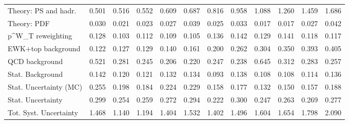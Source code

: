 \begin{tabular}{l|p{0.6cm}p{0.6cm}p{0.6cm}p{0.6cm}p{0.6cm}p{0.6cm}p{0.6cm}p{0.6cm}p{0.6cm}p{0.6cm}p{0.6cm}}
Theory: PS and hadr.                     & 0.501 & 0.516 & 0.552 & 0.609 & 0.687 & 0.816 & 0.958 & 1.088 & 1.260 & 1.459 & 1.686 \\
Theory: PDF                              & 0.030 & 0.021 & 0.023 & 0.027 & 0.039 & 0.025 & 0.033 & 0.017 & 0.017 & 0.027 & 0.042 \\
p^{W}_{T} reweighting                    & 0.128 & 0.103 & 0.112 & 0.109 & 0.105 & 0.136 & 0.142 & 0.129 & 0.141 & 0.118 & 0.117 \\
EWK+top background                       & 0.122 & 0.127 & 0.129 & 0.140 & 0.161 & 0.200 & 0.262 & 0.304 & 0.350 & 0.393 & 0.405 \\
QCD background                           & 0.521 & 0.281 & 0.245 & 0.206 & 0.220 & 0.247 & 0.238 & 0.645 & 0.312 & 0.283 & 0.257 \\
Stat. Background                         & 0.142 & 0.120 & 0.121 & 0.132 & 0.134 & 0.093 & 0.138 & 0.108 & 0.108 & 0.114 & 0.136 \\
Stat. Uncertainty (MC)                   & 0.255 & 0.198 & 0.184 & 0.224 & 0.229 & 0.158 & 0.177 & 0.132 & 0.150 & 0.157 & 0.188 \\
\hline
Stat. Uncertainty                        & 0.299 & 0.254 & 0.259 & 0.272 & 0.294 & 0.222 & 0.300 & 0.247 & 0.263 & 0.269 & 0.277 \\
\hline
Tot. Syst. Uncertainty                   & 1.468 & 1.140 & 1.194 & 1.404 & 1.532 & 1.402 & 1.496 & 1.604 & 1.654 & 1.798 & 2.090 \\
\hline
\end{tabular}
